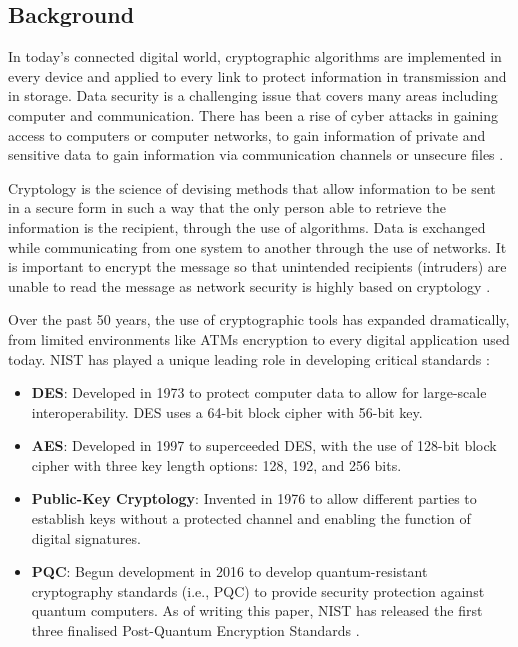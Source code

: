 \subsection{Background}

In today's connected digital world, cryptographic algorithms are implemented in every device and applied to every link to protect information in transmission and in storage.
Data security is a challenging issue that covers many areas including computer and communication.
There has been a rise of cyber attacks in gaining access to computers or computer networks, to gain information of private and sensitive data to gain information via communication channels or unsecure files \cite{csis2025significant}. 

Cryptology is the science of devising methods that allow information to be sent in a secure form in such a way that the only person able to retrieve the information is the recipient, through the use of algorithms. 
Data is exchanged while communicating from one system to another through the use of networks. 
It is important to encrypt the message so that unintended recipients (intruders) are unable to read the message as network security is highly based on cryptology  \cite{Bhanot_2015}.

Over the past 50 years, the use of cryptographic tools has expanded dramatically, from limited environments like \glspl{ATM} encryption to every digital application used today. 
\Gls{NIST} has played a unique leading role in developing critical standards \cite{chen2022cornerstone}:
\begin{itemize}
    \item \textbf{\Gls{DES}}: Developed in 1973 to protect computer data to allow for large-scale interoperability. \Gls{DES} uses a 64-bit block cipher with 56-bit key.
    \item \textbf{\Gls{AES}}: Developed in 1997 to superceeded \gls{DES}, with the use of 128-bit block cipher with three key length options: 128, 192, and 256 bits. 
    \item \textbf{Public-Key Cryptology}: Invented in 1976 to allow different parties to establish keys without a protected channel and enabling the function of digital signatures. 
    \item \textbf{\Gls{PQC}}: Begun development in 2016 to develop quantum-resistant cryptography standards (i.e., \gls{PQC}) to provide security protection against quantum computers. As of writing this paper, \gls{NIST} has released the first three finalised Post-Quantum Encryption Standards \cite{nist2024postquantum}.
\end{itemize}


